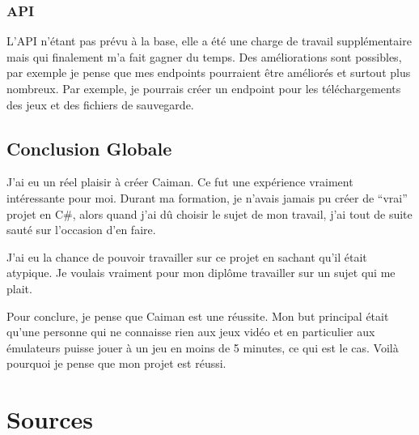 \documentclass[a4paper,12pt,french]{sphinxmanual}
\begin{document}
\subsection{API}
\label{\detokenize{conclusion:api}}
\sphinxAtStartPar
L’API n’étant pas prévu à la base, elle a été une charge de travail supplémentaire mais qui finalement m’a fait gagner du temps. Des améliorations sont possibles, par exemple je pense que mes endpoints pourraient être améliorés et surtout plus nombreux. Par exemple, je pourrais créer un endpoint pour les téléchargements des jeux et des fichiers de sauvegarde.


\section{Conclusion Globale}
\label{\detokenize{conclusion:conclusion-globale}}
\sphinxAtStartPar
J’ai eu un réel plaisir à créer Caiman. Ce fut une expérience vraiment intéressante pour moi. Durant ma formation, je n’avais jamais pu créer de “vrai” projet en C\#, alors quand j’ai dû choisir le sujet de mon travail, j’ai tout de suite sauté sur l’occasion d’en faire.

\sphinxAtStartPar
J’ai eu la chance de pouvoir travailler sur ce projet en sachant qu’il était atypique. Je voulais vraiment pour mon diplôme travailler sur un sujet qui me plait.

\sphinxAtStartPar
Pour conclure, je pense que Caiman est une réussite. Mon but principal était qu’une personne qui ne connaisse rien aux jeux vidéo et en particulier aux émulateurs puisse jouer à un jeu en moins de 5 minutes, ce qui est le cas. Voilà pourquoi je pense que mon projet est réussi.


\chapter{Sources}
\label{\detokenize{sources:sources}}\label{\detokenize{sources::doc}}
\sphinxAtStartPar
{}

\sphinxAtStartPar
{}

\sphinxAtStartPar
{}

\sphinxAtStartPar
{}
\end{document}
